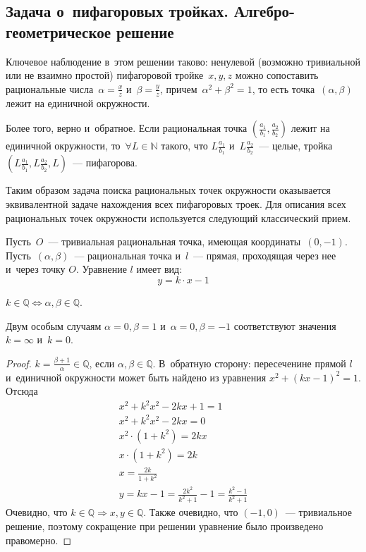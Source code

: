 \documentclass{article}
\begin{document}
\subsection{Задача о~пифагоровых тройках. Алгебро-геометрическое решение}
Ключевое наблюдение в~этом решении таково: ненулевой (возможно тривиальной
или не взаимно простой) пифагоровой тройке~$x, y, z$ можно сопоставить
рациональные числа~$\alpha = \frac{x}{z}$ и~$\beta = \frac{y}{z}$,
причем~$\alpha^2 + \beta^2 = 1$, то есть точка~$(\alpha, \beta)$ лежит на
единичной окружности.

Более того, верно и~обратное. Если рациональная точка
$(\frac{a_1}{b_1}, \frac{a_2}{b_2})$ лежит на единичной окружности,
то~$\forall L \in \mathbb{N}$ такого, что
$L \frac{a_1}{b_1}$ и~$L \frac{a_2}{b_2}$~--- целые, тройка~
$(L \frac{a_1}{b_1}, L \frac{a_2}{b_2}, L)$~--- пифагорова.

Таким образом задача поиска рациональных точек окружности оказывается
эквивалентной задаче нахождения всех пифагоровых троек. Для описания всех
рациональных точек окружности используется следующий классический прием.

Пусть~$O$~--- тривиальная рациональная точка, имеющая координаты~$(0,-1)$.
Пусть~$(\alpha, \beta)$~--- рациональная точка и~$l$~--- прямая, проходящая
через нее и~через точку $O$. Уравнение $l$ имеет вид:
$$y = k \cdot x - 1$$

\begin{claim}
  $k \in \mathbb{Q} \Leftrightarrow \alpha, \beta \in \mathbb{Q}$.
\end{claim}
\begin{remark}
  Двум особым случаям $\alpha = 0, \beta = 1$ и~$\alpha = 0, \beta = -1$
  соответствуют значения $k = \infty$ и~$k = 0$.
\end{remark}
\begin{proof}
  $k = \frac{\beta + 1}{\alpha} \in \mathbb{Q}$,
  если $\alpha, \beta \in \mathbb{Q}$.
  В~обратную сторону: пересеченине прямой $l$ и~единичной окружности может быть
  найдено из уравнения $x^2 + (kx - 1)^2 = 1$. Отсюда
  \begin{gather*}
    x^2 + k^2x^2 - 2kx + 1 = 1\\
    x^2 + k^2x^2 - 2kx = 0\\
    x^2 \cdot (1 + k^2) = 2kx\\
    x \cdot (1 + k^2) = 2k\\
    x = \frac{2k}{1 + k^2}\\
    y = kx - 1 = \frac{2k^2}{k^2+1} - 1 = \frac{k^2 - 1}{k^2 + 1}
  \end{gather*}
  Очевидно, что $k \in \mathbb{Q} \Rightarrow x, y \in \mathbb{Q}$.
  Также очевидно, что $(-1, 0)$~--- тривиальное решение, поэтому
  сокращение при решении уравнение было произведено правомерно.
\end{proof}
\end{document}
